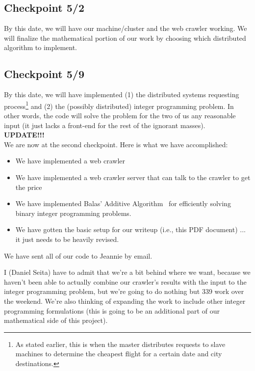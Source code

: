 \documentclass{article}
\begin{document}
\subsection{Checkpoint 5/2}\label{sec:checkpoint1}

By this date, we will have our machine/cluster and the web crawler working. We will finalize the mathematical portion of our work by choosing which
distributed algorithm to implement.

\subsection{Checkpoint 5/9}\label{sec:checkpoint2}

By this date, we will have implemented (1) the distributed systems requesting process\footnote{As stated earlier, this is when the master distributes
requests to slave machines to determine the cheapest flight for a certain date and city destinations.} and (2) the (possibly distributed) integer
programming problem.  In other words, the code will solve the problem for the two of us any reasonable input (it just lacks a front-end for the rest
of the ignorant masses). \\

{\bf UPDATE!!!} \\

We are now at the second checkpoint. Here is what we have accomplished:

\begin{itemize}
    \item We have implemented a web crawler
    \item We have implemented a web crawler server that can talk to the crawler to get the price
    \item We have implemented Balas' Additive Algorithm~\cite{doi:10.1287/opre.13.4.517} for efficiently solving binary integer programming problems.
    \item We have gotten the basic setup for our writeup (i.e., this PDF document) ... it just needs to be heavily revised.
\end{itemize}

We have sent all of our code to Jeannie by email.

I (Daniel Seita) have to admit that we're a bit behind where we want, because we haven't been able to actually combine our crawler's results with the
input to the integer programming problem, but we're going to do nothing but 339 work over the weekend. We're also thinking of expanding the work to
include other integer programming formulations (this is going to be an additional part of our mathematical side of this project).
\end{document}
